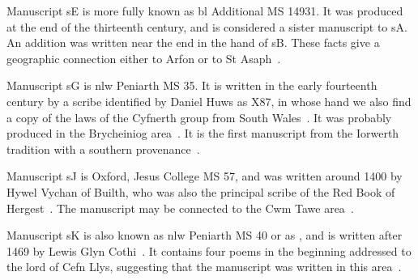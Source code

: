 Manuscript \gls{sE} is more fully known as \gls{bl} Additional MS 14931. It was produced at the end of the thirteenth century, and is considered a sister manuscript to \gls{sA}. An addition was written near the end in the hand of \gls{sB}. These facts give a geographic connection either to Arfon or to St Asaph~\autocite[100]{charles-edwards_welsh_1989}.

Manuscript \gls{sG} is \gls{nlw} Peniarth MS 35. It is written in the early fourteenth century by a scribe identified by Daniel Huws as X87, in whose hand we also find a copy of the laws of the Cyfnerth group from South Wales~\autocite{smith_tei_2013}. It was probably produced in the Brycheiniog area~\autocite[v]{elias_golygiad_2007}. It is the first manuscript from the Iorwerth tradition with a southern provenance~\autocite{charles-edwards_introduction_1986}.

Manuscript \gls{sJ} is Oxford, Jesus College MS 57, and was written around 1400 by Hywel Vychan of Builth, who was also the principal scribe of the Red Book of Hergest~\autocite[100]{charles-edwards_welsh_1989}. The manuscript may be connected to the Cwm Tawe area~\autocite{james_llwyr_1993}.

Manuscript \gls{sK} is also known as \gls{nlw} Peniarth MS 40 or as , and is written after 1469 by Lewis Glyn Cothi~\autocite{roberts_cyfraith_2011}. It contains four poems in the beginning addressed to the lord of Cefn Llys, suggesting that the manuscript was written in this area~\autocite[374]{evans_report_1899}.

